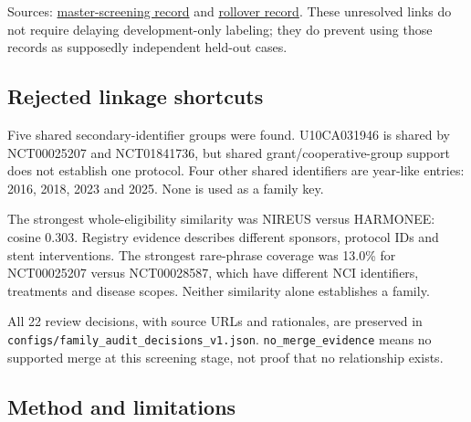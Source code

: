 \documentclass[10pt,letterpaper]{article}
\newcommand{\pathcode}[1]{\nolinkurl{#1}}
\begin{document}
Sources: \href{https://clinicaltrials.gov/api/v2/studies/NCT05419375}{master-screening record} and \href{https://clinicaltrials.gov/api/v2/studies/NCT07172919}{rollover record}. These unresolved links do not require delaying development-only labeling; they do prevent using those records as supposedly independent held-out cases.

\subsection{Rejected linkage shortcuts}\label{audit-rejected-linkage-shortcuts}

Five shared secondary-identifier groups were found. U10CA031946 is shared by NCT00025207 and NCT01841736, but shared grant/cooperative-group support does not establish one protocol. Four other shared identifiers are year-like entries: 2016, 2018, 2023 and 2025. None is used as a family key.

The strongest whole-eligibility similarity was NIREUS versus HARMONEE: cosine 0.303. Registry evidence describes different sponsors, protocol IDs and stent interventions. The strongest rare-phrase coverage was 13.0\% for NCT00025207 versus NCT00028587, which have different NCI identifiers, treatments and disease scopes. Neither similarity alone establishes a family.

All 22 review decisions, with source URLs and rationales, are preserved in \pathcode{configs/family_audit_decisions_v1.json}. \pathcode{no_merge_evidence} means no supported merge at this screening stage, not proof that no relationship exists.

\subsection{Method and limitations}\label{audit-method-and-limitations}
\end{document}
